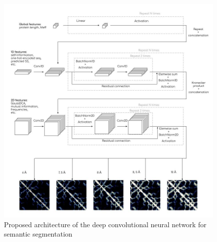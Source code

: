   \begin{figure}[H]
    \begin{center}
      \includegraphics[width=\textwidth, keepaspectratio]{imgs/architecture.jpg}
       \caption{Proposed architecture of the deep convolutional neural network for semantic segmentation}
      \label{architecture}
    \end{center}
  \end{figure}